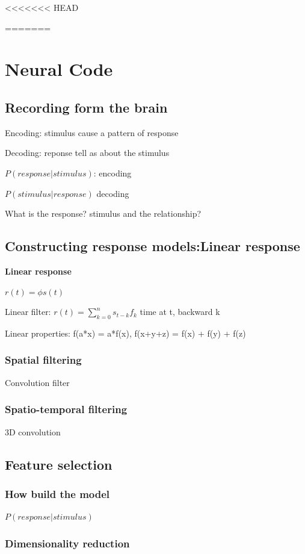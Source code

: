 \documentclass{book}
\begin{document}
<<<<<<< HEAD


\pagebreak
=======
\chapter{Neural Code}
\section{Recording form the brain}
Encoding: stimulus cause a pattern of response

Decoding: reponse tell as about the stimulus

$P(response | stimulus) $: encoding

$P(stimulus | response)$ decoding

What is the response? stimulus and the relationship?

\section{Constructing response models:Linear response}

\textbf{Linear response }

$r(t) = \phi s(t)$

Linear filter:  $r(t) = \sum_{k=0}^{n} s_{t-k} f_k$ time at t, backward k

Linear properties: f(a*x) = a*f(x), f(x+y+z) = f(x) + f(y) + f(z)

\subsection{Spatial filtering}

Convolution filter

\subsection{Spatio-temporal filtering}

3D convolution 

\section{Feature selection}

\subsection{How build the model}

$P(response|stimulus)$ 

\subsection{Dimensionality reduction}
\end{document}
